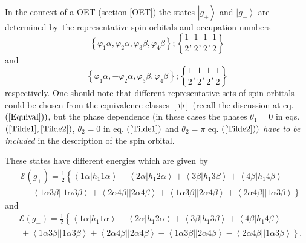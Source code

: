 \documentclass[aps,preprint]{revtex4}%
\begin{document}
In the context of a OET (section \ref{OET}) the states $\left\vert
g_{+}\right\rangle $ and $\left\vert g_{-}\right\rangle $ are determined
by\ the representative spin orbitals and occupation numbers
\begin{equation}
\left\{  \varphi_{1}\alpha,\varphi_{2}\alpha,\varphi_{3}\beta,\varphi_{4}%
\beta\right\}  ;\left\{  \frac{1}{2},\frac{1}{2},\frac{1}{2},\frac{1}%
{2}\right\}  \label{Tilde1}%
\end{equation}
and%
\begin{equation}
\left\{  \varphi_{1}\alpha,-\varphi_{2}\alpha,\varphi_{3}\beta,\varphi
_{4}\beta\right\}  ;\left\{  \frac{1}{2},\frac{1}{2},\frac{1}{2},\frac{1}%
{2}\right\}  \label{Tilde2}%
\end{equation}
respectively. One should note that different representative sets of spin
orbitals could be chosen from the equivalence classes $\left[
\boldsymbol{\psi}\right]  $ (recall the discussion at eq. $\left(
\ref{Equival}\right)  )$, but the phase dependence (in these cases the phases
$\theta_{1}=0$ in eqs. $\left(  \ref{Tilde1},\ref{Tilde2}\right)  $,
$\theta_{2}=0$ in eq. $\left(  \ref{Tilde1}\right)  $ and $\theta_{2}=\pi$ eq.
$\left(  \ref{Tilde2}\right)  )$ \emph{have to be included} in the description
of the spin orbital.

These states have different energies which are given by
\begin{align}
&  \mathcal{E}\left(  g_{+}\right)  =\frac{1}{2}\left\{  \overset
{}{\left\langle 1\alpha\left\vert h_{1}1\alpha\right.  \right\rangle
+\left\langle 2\alpha\left\vert h_{1}2\alpha\right.  \right\rangle
+\left\langle 3\beta\left\vert h_{1}3\beta\right.  \right\rangle +\left\langle
4\beta\left\vert h_{1}4\beta\right.  \right\rangle }\right. \nonumber\\
&  \left.  \,+\left\langle 1\alpha3\beta\right\vert \left\vert 1\alpha
3\beta\right\rangle +\left\langle 2\alpha4\beta\right\vert \left\vert
2\alpha4\beta\right\rangle +\left\langle 1\alpha3\beta\right\vert \left\vert
2\alpha4\beta\right\rangle +\left\langle 2\alpha4\beta\right\vert \left\vert
1\alpha3\beta\right\rangle \overset{}{}\right\}  \label{E+}%
\end{align}
and
\begin{align}
&  \mathcal{E}\left(  g_{-}\right)  =\frac{1}{2}\left\{  \overset
{}{\left\langle 1\alpha\left\vert h_{1}1\alpha\right.  \right\rangle
+\left\langle 2\alpha\left\vert h_{1}2\alpha\right.  \right\rangle
+\left\langle 3\beta\left\vert h_{1}3\beta\right.  \right\rangle +\left\langle
4\beta\left\vert h_{1}4\beta\right.  \right\rangle }\right. \nonumber\\
&  \left.  \,+\left\langle 1\alpha3\beta\right\vert \left\vert 1\alpha
3\beta\right\rangle +\left\langle 2\alpha4\beta\right\vert \left\vert
2\alpha4\beta\right\rangle -\left\langle 1\alpha3\beta\right\vert \left\vert
2\alpha4\beta\right\rangle -\left\langle 2\alpha4\beta\right\vert \left\vert
1\alpha3\beta\right\rangle \overset{}{}\right\}  . \label{E-}%
\end{align}
\end{document}
